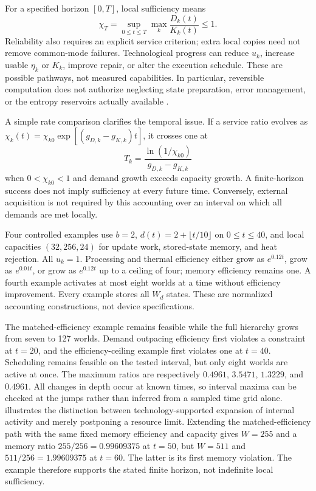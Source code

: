 \documentclass[11pt,a4paper]{article}
\theoremstyle{definition}\newtheorem{definition}{Definition}
\begin{document}
For a specified horizon $[0,T]$, local sufficiency means
\begin{equation}
 \chi_T=\sup_{0\leq t\leq T}\max_k\frac{D_k(t)}{K_k(t)}\leq1.
 \label{eq:chi}
\end{equation}
Reliability also requires an explicit service criterion; extra local copies need not remove common-mode failures. Technological progress can reduce $u_k$, increase usable $\eta_k$ or $K_k$, improve repair, or alter the execution schedule. These are possible pathways, not measured capabilities. In particular, reversible computation does not authorize neglecting state preparation, error management, or the entropy reservoirs actually available \citep{Bennett1973,BennettHansonRiedel2019}.

A simple rate comparison clarifies the temporal issue. If a service ratio evolves as $\chi_k(t)=\chi_{k0}\exp[(g_{D,k}-g_{K,k})t]$, it crosses one at
\begin{equation}
 T_k=\frac{\ln(1/\chi_{k0})}{g_{D,k}-g_{K,k}}
 \label{eq:crossing}
\end{equation}
when $0<\chi_{k0}<1$ and demand growth exceeds capacity growth. A finite-horizon success does not imply sufficiency at every future time. Conversely, external acquisition is not required by this accounting over an interval on which all demands are met locally.

Four controlled examples use $b=2$, $d(t)=2+\lfloor t/10\rfloor$ on $0\leq t\leq40$, and local capacities $(32,256,24)$ for update work, stored-state memory, and heat rejection. All $u_k=1$. Processing and thermal efficiency either grow as $e^{0.12t}$, grow as $e^{0.01t}$, or grow as $e^{0.12t}$ up to a ceiling of four; memory efficiency remains one. A fourth example activates at most eight worlds at a time without efficiency improvement. Every example stores all $W_d$ states. These are normalized accounting constructions, not device specifications.

The matched-efficiency example remains feasible while the full hierarchy grows from seven to 127 worlds. Demand outpacing efficiency first violates a constraint at $t=20$, and the efficiency-ceiling example first violates one at $t=40$. Scheduling remains feasible on the tested interval, but only eight worlds are active at once. The maximum ratios are respectively $0.4961$, $3.5471$, $1.3229$, and $0.4961$. All changes in depth occur at known times, so interval maxima can be checked at the jumps rather than inferred from a sampled time grid alone.  illustrates the distinction between technology-supported expansion of internal activity and merely postponing a resource limit. Extending the matched-efficiency path with the same fixed memory efficiency and capacity gives $W=255$ and a memory ratio $255/256=0.99609375$ at $t=50$, but $W=511$ and $511/256=1.99609375$ at $t=60$. The latter is its first memory violation. The example therefore supports the stated finite horizon, not indefinite local sufficiency.
\end{document}
